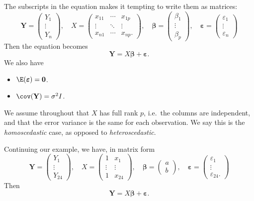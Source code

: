 \documentclass[a4paper]{article}
\begin{document}
The subscripts in the equation makes it tempting to write them as matrices:
\[
  \mathbf{Y} =
  \begin{pmatrix}
    Y_1\\
    \vdots\\
    Y_n
  \end{pmatrix}, \quad
  X =
  \begin{pmatrix}
    x_{11} & \cdots & x_{1p}\\
    \vdots & \ddots & \vdots\\
    x_{n1} & \cdots & x_{np}.
  \end{pmatrix},\quad
  \boldsymbol\beta =
  \begin{pmatrix}
    \beta_1\\
    \vdots\\
    \beta_p
  \end{pmatrix}, \quad
  \boldsymbol\varepsilon =
  \begin{pmatrix}
    \varepsilon_1\\
    \vdots\\
    \varepsilon_n
  \end{pmatrix}
\]
Then the equation becomes
\[
  \mathbf{Y} = X\boldsymbol\beta + \boldsymbol\varepsilon.\tag{2}
\]
We also have
\begin{itemize}
  \item $\E(\boldsymbol\varepsilon) = \mathbf{0}$.
  \item $\cov (\mathbf{Y}) = \sigma^2 I$.
\end{itemize}
We assume throughout that $X$ has full rank $p$, i.e.\ the columns are independent, and that the error variance is the same for each observation. We say this is the \emph{homoscedastic} case, as opposed to \emph{heteroscedastic}.

\begin{eg}
  Continuing our example, we have, in matrix form
  \[
    \mathbf{Y} =
    \begin{pmatrix}
      Y_1\\
      \vdots\\
      Y_{24}
    \end{pmatrix}, \quad
    X =
    \begin{pmatrix}
      1 & x_1\\
      \vdots & \vdots \\
      1 & x_{24}
    \end{pmatrix}, \quad
    \boldsymbol\beta =
    \begin{pmatrix}
      a\\
      b
    \end{pmatrix}, \quad
    \boldsymbol\varepsilon =
    \begin{pmatrix}
      \varepsilon_1\\
      \vdots\\
      \varepsilon_{24}.
    \end{pmatrix}
  \]
  Then
  \[
    \mathbf{Y} = X\boldsymbol\beta + \boldsymbol\varepsilon.
  \]
\end{eg}
\end{document}
